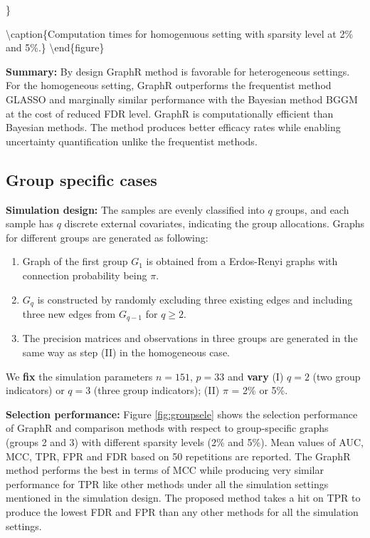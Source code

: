 \documentclass[
]{book}
\begin{document}
\}

\textbackslash caption\{Computation times for homogenuous setting with sparsity level at 2\% and 5\%.\}\label{fig:homotime}
\textbackslash end\{figure\}

\textbf{Summary:} By design GraphR method is favorable for heterogeneous settings. For the homogeneous setting, GraphR outperforms the frequentist method GLASSO and marginally similar performance with the Bayesian method BGGM at the cost of reduced FDR level. GraphR is computationally efficient than Bayesian methods. The method produces better efficacy rates while enabling uncertainty quantification unlike the frequentist methods.

\hypertarget{simgroupspec}{%
\subsection{Group specific cases}\label{simgroupspec}}

\textbf{Simulation design:}
The samples are evenly classified into \(q\) groups, and each sample has \(q\) discrete external covariates, indicating the group allocations. Graphs for different groups are generated as following:

\begin{enumerate}
\def\labelenumi{(\Roman{enumi})}
\item
  Graph of the first group \(G_1\) is obtained from a Erdos-Renyi graphs with connection probability being \(\pi\).
\item
  \(G_q\) is constructed by randomly excluding three existing edges and including three new edges from \(G_{q-1}\) for \(q \geq 2\).
\item
  The precision matrices and observations in three groups are generated in the same way as step (II) in the homogeneous case.
\end{enumerate}

We \textbf{fix} the simulation parameters \(n = 151\), \(p = 33\) and \textbf{vary} (I) \(q = 2\) (two group indicators) or \(q = 3\) (three group indicators); (II) \(\pi\) = 2\% or 5\%.

\textbf{Selection performance:}
Figure \ref{fig:groupsele} shows the selection performance of GraphR and comparison methods with respect to group-specific graphs (groups 2 and 3) with different sparsity levels (2\% and 5\%). Mean values of AUC, MCC, TPR, FPR and FDR based on 50 repetitions are reported. The GraphR method performs the best in terms of MCC while producing very similar performance for TPR like other methods under all the simulation settings mentioned in the simulation design. The proposed method takes a hit on TPR to produce the lowest FDR and FPR than any other methods for all the simulation settings.
\end{document}
